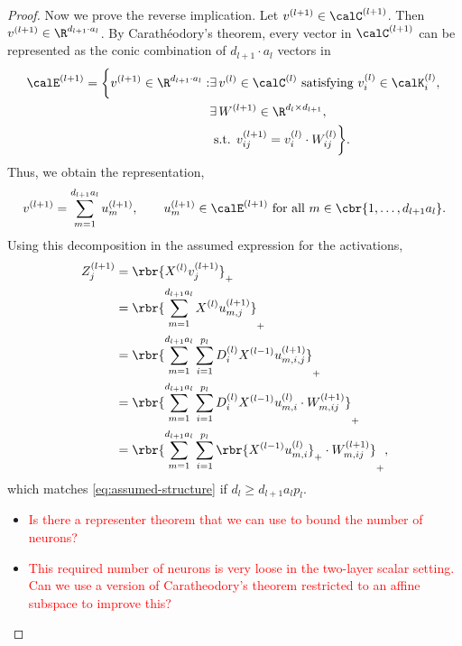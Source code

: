 \documentclass{article}
\newcommand{\calKl}{\calK^{(l)}}
\begin{document}
\begin{proof}
    Now we prove the reverse implication.
    Let \( v^{(l+1)} \in \calC^{(l+1)} \).
    Then \( v^{(l+1)} \in \R^{d_{l+1} \cdot a_l} \).
    By Carathéodory's theorem, every vector in \( \calC^{(l+1)} \) can be
    represented as the conic combination of \( d_{l+1} \cdot a_l \) vectors
    in
    \[
        \begin{aligned}
            \calE^{(l+1)}
            =
            \bigg\{
            v^{(l+1)} \in \R^{d_{l+1} \cdot a_l} :
             & \exists \, v^{(l)} \in \calC^{(l)}
            \text{ satisfying } v_{i}^{(l)} \in \calKl_i, \,                 \\
             & \exists \, W^{(l+1)} \in \R^{d_l \times d_{l+1}},             \\
             & \text{ s.t. } v^{(l+1)}_{ij} = v^{(l)}_{i} \cdot W_{ij}^{(l)}
            \bigg\}.
        \end{aligned}
    \]
    Thus, we obtain the representation,
    \begin{equation}
        v^{(l+1)}
        = \sum_{m=1}^{d_{l+1} a_l} u_m^{(l+1)},
        \quad \quad u_m^{(l+1)} \in \calE^{(l+1)}
        \text{ for all } m \in \cbr{1, \ldots, d_{l+1} a_l}.
    \end{equation}
    Using this decomposition in the assumed expression for the activations,
    \begin{align*}
        Z_{j}^{(l+1)}
         & = \rbr{X^{(l)} v^{(l+1)}_{j}}_+                              \\
         & = \rbr{\sum_{m=1}^{d_{l+1} a_l} X^{(l)} u^{(l+1)}_{m, j}}_+  \\
         & = \rbr{\sum_{m=1}^{d_{l+1} a_l} \sum_{i=1}^{p_l}
        D_{i}^{(l)} X^{(l-1)} u^{(l+1)}_{m, i, j}}_+                    \\
         & = \rbr{\sum_{m=1}^{d_{l+1} a_l} \sum_{i=1}^{p_l}
        D_{i}^{(l)} X^{(l-1)} u^{(l)}_{m, i} \cdot W_{m, ij}^{(l+1)}}_+ \\
         & = \rbr{\sum_{m=1}^{d_{l+1} a_l} \sum_{i=1}^{p_l}
        \rbr{X^{(l-1)} u^{(l)}_{m, i}}_+ \cdot W_{m, ij}^{(l+1)}}_+,
    \end{align*}
    which matches \cref{eq:assumed-structure} if \( d_l \geq d_{l+1} a_l p_l \).

    \begin{itemize}
        \item
              \textcolor{red}{Is there a representer theorem that we can use to
                  bound the number of neurons?}

        \item
              \textcolor{red}{This required number of neurons is very loose in
                  the two-layer scalar setting.  Can we use a version of
                  Caratheodory's theorem restricted to an affine subspace to improve
                  this?}
    \end{itemize}

\end{proof}
\end{document}
